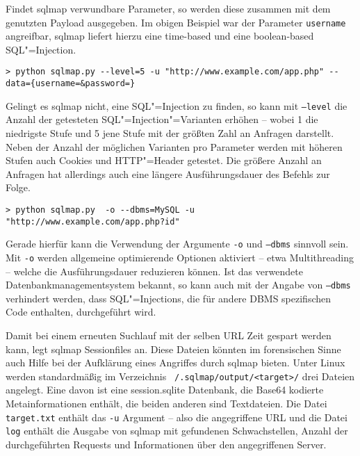 Findet sqlmap verwundbare Parameter, so werden diese zusammen mit dem genutzten Payload ausgegeben. Im obigen Beispiel war der Parameter \texttt{username} angreifbar, sqlmap liefert hierzu eine time-based und eine boolean-based SQL"=Injection.

\begin{listing}[ht!]
\begin{verbatim}
> python sqlmap.py --level=5 -u "http://www.example.com/app.php" --data={username=&password=}
\end{verbatim}
\end{listing}

Gelingt es sqlmap nicht, eine SQL"=Injection zu finden, so kann mit \texttt{--level} die Anzahl der getesteten SQL"=Injection"=Varianten erhöhen -- wobei 1 die niedrigste Stufe und 5 jene Stufe mit der größten Zahl an Anfragen darstellt. Neben der Anzahl der möglichen Varianten pro Parameter werden mit höheren Stufen auch Cookies und HTTP"=Header getestet. Die größere Anzahl an Anfragen hat allerdings auch eine längere Ausführungsdauer des Befehls zur Folge.

\begin{listing}[ht!]
\begin{verbatim}
> python sqlmap.py  -o --dbms=MySQL -u "http://www.example.com/app.php?id"
\end{verbatim}
\end{listing}

Gerade hierfür kann die Verwendung der Argumente \texttt{-o} und \texttt{--dbms} sinnvoll sein. Mit \texttt{-o} werden allgemeine optimierende Optionen aktiviert -- etwa Multithreading -- welche die Ausführungsdauer reduzieren können. Ist das verwendete Datenbankmanagementsystem bekannt, so kann auch mit der Angabe von \texttt{--dbms} verhindert werden, dass SQL"=Injections, die für andere DBMS spezifischen Code enthalten, durchgeführt wird.


Damit bei einem erneuten Suchlauf mit der selben URL Zeit gespart werden kann, legt sqlmap Sessionfiles an. Diese Dateien könnten im forensischen Sinne auch Hilfe bei der Aufklärung eines Angriffes durch sqlmap bieten. Unter Linux werden standardmäßig im Verzeichnis \texttt{~/.sqlmap/output/<target>/} drei Dateien angelegt. Eine davon ist eine session.sqlite Datenbank, die Base64 kodierte Metainformationen enthält, die beiden anderen sind Textdateien. Die Datei \texttt{target.txt} enthält das \texttt{-u} Argument -- also die angegriffene URL und die Datei \texttt{log} enthält die Ausgabe von sqlmap mit gefundenen Schwachstellen, Anzahl der durchgeführten Requests und Informationen über den angegriffenen Server.

